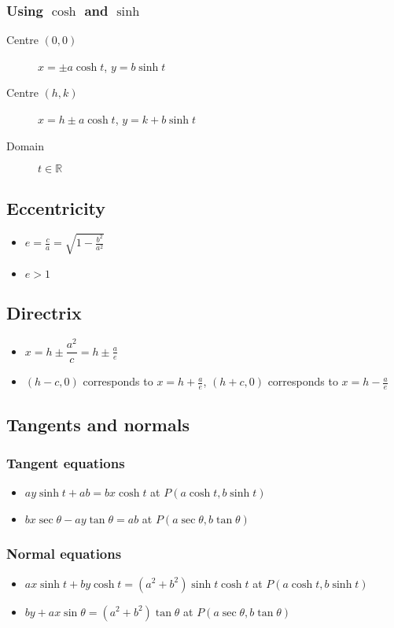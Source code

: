 \subsubsection{Using $\cosh$ and $\sinh$}

\begin{description}
    \item[Centre $(0,0)$] $x=\pm a\cosh t$, $y=b\sinh t$
    \item[Centre $(h,k)$] $x=h\pm a\cosh t$, $y=k+b\sinh t$
    \item[Domain] $t \in \mathbb{R}$
\end{description}
\subsection{Eccentricity}
\begin{itemize}
    \item $e=\frac{c}{a}=\sqrt{1-\frac{b^2}{a^2}}$
    \item $e>1$
\end{itemize}
\subsection{Directrix}
\begin{itemize}
    \item $x=h\pm \dfrac{a^2}{c} = h\pm\frac{a}{e}$
    \item $(h-c, 0)$ corresponds to $x=h+\frac{a}{e}$, $(h+c, 0)$ corresponds to $x=h-\frac{a}{e}$
\end{itemize}
\subsection{Tangents and normals}
\subsubsection{Tangent equations}
\begin{itemize}
    \item $ay\sinh t + ab = bx\cosh t$ at $P(a\cosh t, b\sinh t)$
    \item $bx\sec\theta-ay\tan\theta = ab$ at $P(a\sec\theta, b\tan\theta)$
\end{itemize}
\subsubsection{Normal equations}
\begin{itemize}
    \item $ax\sinh t + by\cosh t = (a^2+b^2)\sinh t\cosh t$ at $P(a\cosh t, b\sinh t)$
    \item $by + ax\sin\theta = (a^2+b^2)\tan\theta$ at $P(a\sec\theta, b\tan\theta)$
\end{itemize}